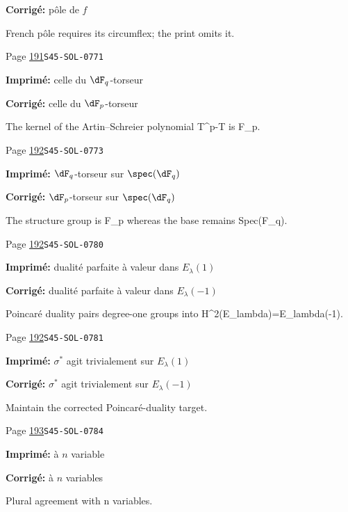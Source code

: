 \begin{description}
\par\noindent\textbf{Corrigé:} pôle de $f$
\par\noindent French pôle requires its circumflex; the print omits it.
\smallskip
\item[\hypertarget{apparatus:FR-0162}{162}] Page \hyperlink{printpage:fr:191}{191}\quad\texttt{S45-SOL-0771}
\par\noindent\textbf{Imprimé:} celle du $\dF_q$-torseur
\par\noindent\textbf{Corrigé:} celle du $\dF_p$-torseur
\par\noindent The kernel of the Artin–Schreier polynomial T\textasciicircum{}p-T is F\_p.
\smallskip
\item[\hypertarget{apparatus:FR-0163}{163}] Page \hyperlink{printpage:fr:192}{192}\quad\texttt{S45-SOL-0773}
\par\noindent\textbf{Imprimé:} $\dF_q$-torseur sur $\spec(\dF_q)$
\par\noindent\textbf{Corrigé:} $\dF_p$-torseur sur $\spec(\dF_q)$
\par\noindent The structure group is F\_p whereas the base remains Spec(F\_q).
\smallskip
\item[\hypertarget{apparatus:FR-0164}{164}] Page \hyperlink{printpage:fr:192}{192}\quad\texttt{S45-SOL-0780}
\par\noindent\textbf{Imprimé:} dualité parfaite à valeur dans $E_\lambda(1)$
\par\noindent\textbf{Corrigé:} dualité parfaite à valeur dans $E_\lambda(-1)$
\par\noindent Poincaré duality pairs degree-one groups into H\textasciicircum{}2(E\_lambda)=E\_lambda(-1).
\smallskip
\item[\hypertarget{apparatus:FR-0165}{165}] Page \hyperlink{printpage:fr:192}{192}\quad\texttt{S45-SOL-0781}
\par\noindent\textbf{Imprimé:} $\sigma^\ast$ agit trivialement sur $E_\lambda(1)$
\par\noindent\textbf{Corrigé:} $\sigma^\ast$ agit trivialement sur $E_\lambda(-1)$
\par\noindent Maintain the corrected Poincaré-duality target.
\smallskip
\item[\hypertarget{apparatus:FR-0166}{166}] Page \hyperlink{printpage:fr:193}{193}\quad\texttt{S45-SOL-0784}
\par\noindent\textbf{Imprimé:} à $n$ variable
\par\noindent\textbf{Corrigé:} à $n$ variables
\par\noindent Plural agreement with n variables.

\end{description}
